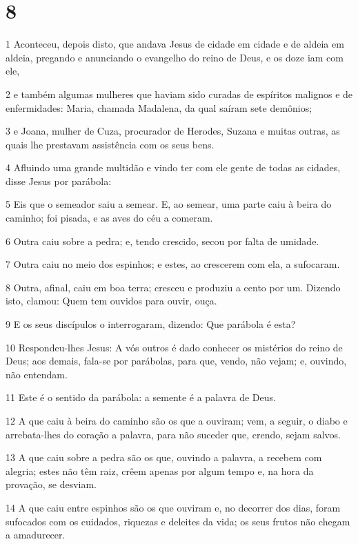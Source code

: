 \chapter{8}

\par 1 Aconteceu, depois disto, que andava Jesus de cidade em cidade e de aldeia em aldeia, pregando e anunciando o evangelho do reino de Deus, e os doze iam com ele,
\par 2 e também algumas mulheres que haviam sido curadas de espíritos malignos e de enfermidades: Maria, chamada Madalena, da qual saíram sete demônios;
\par 3 e Joana, mulher de Cuza, procurador de Herodes, Suzana e muitas outras, as quais lhe prestavam assistência com os seus bens.
\par 4 Afluindo uma grande multidão e vindo ter com ele gente de todas as cidades, disse Jesus por parábola:
\par 5 Eis que o semeador saiu a semear. E, ao semear, uma parte caiu à beira do caminho; foi pisada, e as aves do céu a comeram.
\par 6 Outra caiu sobre a pedra; e, tendo crescido, secou por falta de umidade.
\par 7 Outra caiu no meio dos espinhos; e estes, ao crescerem com ela, a sufocaram.
\par 8 Outra, afinal, caiu em boa terra; cresceu e produziu a cento por um. Dizendo isto, clamou: Quem tem ouvidos para ouvir, ouça.
\par 9 E os seus discípulos o interrogaram, dizendo: Que parábola é esta?
\par 10 Respondeu-lhes Jesus: A vós outros é dado conhecer os mistérios do reino de Deus; aos demais, fala-se por parábolas, para que, vendo, não vejam; e, ouvindo, não entendam.
\par 11 Este é o sentido da parábola: a semente é a palavra de Deus.
\par 12 A que caiu à beira do caminho são os que a ouviram; vem, a seguir, o diabo e arrebata-lhes do coração a palavra, para não suceder que, crendo, sejam salvos.
\par 13 A que caiu sobre a pedra são os que, ouvindo a palavra, a recebem com alegria; estes não têm raiz, crêem apenas por algum tempo e, na hora da provação, se desviam.
\par 14 A que caiu entre espinhos são os que ouviram e, no decorrer dos dias, foram sufocados com os cuidados, riquezas e deleites da vida; os seus frutos não chegam a amadurecer.
